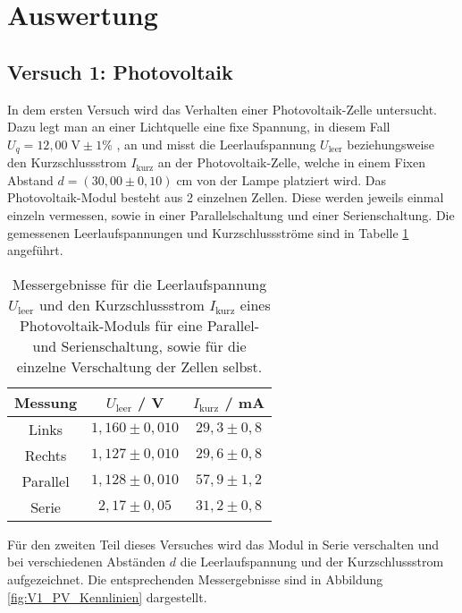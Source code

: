 \documentclass{article}
\begin{document}
\setcounter{totalnumber}{4}


\cfoot{\thepage{} / \pageref{LastPage}}

\tableofcontents
\newpage

\section{Auswertung}
\subsection{Versuch 1: Photovoltaik}
\noindent In dem ersten Versuch wird das Verhalten einer Photovoltaik-Zelle untersucht. Dazu legt man an einer Lichtquelle eine fixe Spannung, in diesem Fall $U_q = 12{,}00 \; \text{V} \pm 1\%$ , an und misst die Leerlaufspannung $U_\text{leer}$ beziehungsweise den Kurzschlussstrom $I_\text{kurz}$ an der Photovoltaik-Zelle, welche in einem Fixen Abstand $d=(30{,}00 \pm 0{,}10) \; \text{cm}$ von der Lampe platziert wird. Das Photovoltaik-Modul besteht aus 2 einzelnen Zellen. Diese werden jeweils einmal einzeln vermessen, sowie in einer Parallelschaltung und einer Serienschaltung. Die gemessenen Leerlaufspannungen und Kurzschlussströme sind in Tabelle \ref{tab:MessungenWiderstand} angeführt.
\begin{table}[h]
    \centering
    \caption{Messergebnisse für die Leerlaufspannung $U_\text{leer}$ und den Kurzschlussstrom $I_\text{kurz}$ eines Photovoltaik-Moduls für eine Parallel- und Serienschaltung, sowie für die einzelne Verschaltung der Zellen selbst.}
    \label{tab:MessungenWiderstand}
    \begin{tabular}{c|c|c}
    Messung & $U_{\text{leer}}$ / V & $I_{\text{kurz}}$ / mA \\\hline
    Links & $1{,}160 \pm 0{,}010$ & $29{,}3 \pm 0{,}8$ \\
    Rechts & $1{,}127 \pm 0{,}010$ & $29{,}6 \pm 0{,}8$ \\
    Parallel & $1{,}128 \pm 0{,}010$ & $57{,}9 \pm 1{,}2$ \\
    Serie & $2{,}17 \pm 0{,}05$ & $31{,}2 \pm 0{,}8$ \\
    \end{tabular}
\end{table}

\noindent Für den zweiten Teil dieses Versuches wird das Modul in Serie verschalten und bei verschiedenen Abständen $d$ die Leerlaufspannung und der Kurzschlussstrom aufgezeichnet. Die entsprechenden Messergebnisse sind in Abbildung \ref{fig:V1_PV_Kennlinien} dargestellt.
\end{document}

